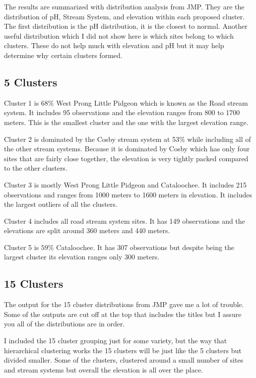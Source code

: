 \documentclass[11pt]{article} %
\begin{document}
The results are summarized with distribution analysis from JMP.  They are the distribution of pH, Stream System, and elevation within each proposed cluster.  The first distribution is the pH distribution, it is the closest to normal.  Another useful distribution which I did not show here is which sites belong to which clusters. These do not help much with elevation and pH but it may help determine why certain clusters formed.

\subsection{5 Clusters}
Cluster 1 is $68\%$ West Prong Little Pidgeon which is known as the Road stream system.  It includes 95 observations and the elevation ranges from 800 to 1700 meters.  This is the smallest cluster and the one with the largest elevation range.

Cluster 2 is dominated by the Cosby stream system at 53$\%$ while including all of the other stream systems.   Because it is dominated by Cosby which has only four sites that are fairly close together, the elevation is very tightly packed compared to the other clusters.

Cluster 3 is mostly West Prong Little Pidgeon and Cataloochee.  It includes 215 observations and ranges from 1000 meters to 1600 meters in elevation.  It includes the largest outliers of all the clusters.

Cluster 4 includes all road stream system sites.  It has 149 observations and the elevations are split around 360 meters and 440 meters.

Cluster 5 is $59\%$ Cataloochee.  It has 307 observations but despite being the largest cluster its elevation ranges only 300 meters.

\subsection{15 Clusters}
The output for the 15 cluster distributions from JMP gave me a lot of trouble.  Some of the outputs are cut off at the top that includes the titles but I assure you all of the distributions are in order.

I included the 15 cluster grouping just for some variety, but the way that hierarchical clustering works the 15 clusters will be just like the 5 clusters but divided smaller.  Some of the clusters, clustered around a small number of sites and stream systems but overall the elevation is all over the place.
\end{document}

